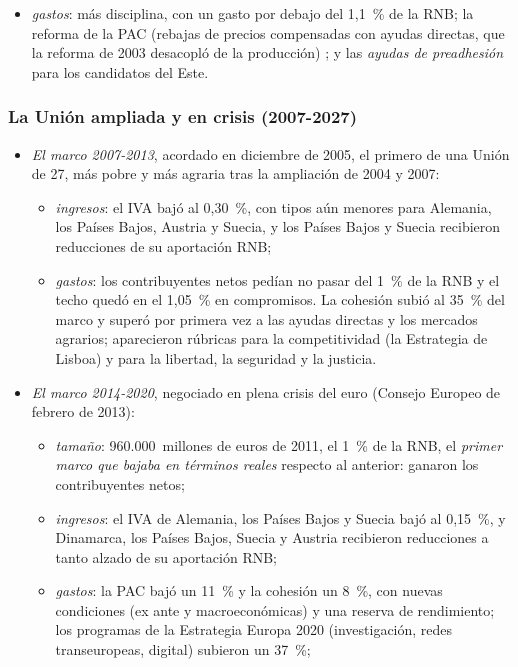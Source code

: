 \documentclass[11pt]{article}
\begin{document}
\begin{itemize}
\begin{itemize}
  \item \emph{gastos}: más disciplina, con un gasto por debajo del 1,1~\% de la RNB; la reforma de la PAC (rebajas de precios compensadas con ayudas directas, que la reforma de 2003 desacopló de la producción) ; y las \emph{ayudas de preadhesión} para los candidatos del Este.
  \end{itemize}
\end{itemize}

\subsubsection{La Unión ampliada y en crisis (2007-2027)}\label{sec:historia-ampliada}

\begin{itemize}
\item \emph{El marco 2007-2013}, acordado en diciembre de 2005\nocite{CE2014Finance}, el primero de una Unión de 27, más pobre y más agraria tras la ampliación de 2004 y 2007:
  \begin{itemize}
  \item \emph{ingresos}: el IVA bajó al 0,30~\%, con tipos aún menores para Alemania, los Países Bajos, Austria y Suecia, y los Países Bajos y Suecia recibieron reducciones de su aportación RNB;
  \item \emph{gastos}: los contribuyentes netos pedían no pasar del 1~\% de la RNB y el techo quedó en el 1,05~\% en compromisos. La cohesión subió al 35~\% del marco y superó por primera vez a las ayudas directas y los mercados agrarios; aparecieron rúbricas para la competitividad (la Estrategia de Lisboa) y para la libertad, la seguridad y la justicia.
  \end{itemize}
\item \emph{El marco 2014-2020}, negociado en plena crisis del euro (Consejo Europeo de febrero de 2013)\nocite{CE2014Finance}:
  \begin{itemize}
  \item \emph{tamaño}: 960.000~millones de euros de 2011, el 1~\% de la RNB, el \emph{primer marco que bajaba en términos reales} respecto al anterior: ganaron los contribuyentes netos;
  \item \emph{ingresos}: el IVA de Alemania, los Países Bajos y Suecia bajó al 0,15~\%, y Dinamarca, los Países Bajos, Suecia y Austria recibieron reducciones a tanto alzado de su aportación RNB;
  \item \emph{gastos}: la PAC bajó un 11~\% y la cohesión un 8~\%, con nuevas condiciones (ex ante y macroeconómicas) y una reserva de rendimiento; los programas de la Estrategia Europa 2020 (investigación, redes transeuropeas, digital) subieron un 37~\%;

\end{itemize}
\end{itemize}
\end{document}
